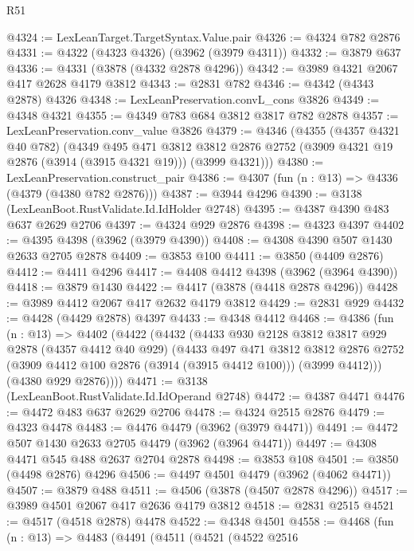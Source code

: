 \begin{lexlean}{R51}
\begin{coremodule}
@4324 := LexLeanTarget.TargetSyntax.Value.pair
@4326 := @4324 @782 @2876
@4331 := @4322 (@4323 @4326) (@3962 (@3979 @4311))
@4332 := @3879 @637
@4336 := @4331 (@3878 (@4332 @2878 @4296))
@4342 := @3989 @4321 @2067 @417 @2628 @4179 @3812
@4343 := @2831 @782
@4346 := @4342 (@4343 @2878) @4326
@4348 := LexLeanPreservation.convL_cons @3826
@4349 := @4348 @4321
@4355 := @4349 @783 @684 @3812 @3817 @782 @2878
@4357 := LexLeanPreservation.conv_value @3826
@4379 := @4346
    (@4355
      (@4357 @4321 @40 @782)
      (@4349
        @495
        @471
        @3812
        @3812
        @2876
        @2752
        (@3909 @4321 @19 @2876 (@3914 (@3915 @4321 @19)))
        (@3999 @4321)))
@4380 := LexLeanPreservation.construct_pair
@4386 := @4307 (fun (n : @13) => @4336 (@4379 (@4380 @782 @2876)))
@4387 := @3944 @4296
@4390 := @3138 (LexLeanBoot.RustValidate.Id.IdHolder @2748)
@4395 := @4387 @4390 @483 @637 @2629 @2706
@4397 := @4324 @929 @2876
@4398 := @4323 @4397
@4402 := @4395 @4398 (@3962 (@3979 @4390))
@4408 := @4308 @4390 @507 @1430 @2633 @2705 @2878
@4409 := @3853 @100
@4411 := @3850 (@4409 @2876)
@4412 := @4411 @4296
@4417 := @4408 @4412 @4398 (@3962 (@3964 @4390))
@4418 := @3879 @1430
@4422 := @4417 (@3878 (@4418 @2878 @4296))
@4428 := @3989 @4412 @2067 @417 @2632 @4179 @3812
@4429 := @2831 @929
@4432 := @4428 (@4429 @2878) @4397
@4433 := @4348 @4412
@4468 := @4386
    (fun (n : @13) =>
    @4402
      (@4422
        (@4432
          (@4433
            @930
            @2128
            @3812
            @3817
            @929
            @2878
            (@4357 @4412 @40 @929)
            (@4433
              @497
              @471
              @3812
              @3812
              @2876
              @2752
              (@3909 @4412 @100 @2876 (@3914 (@3915 @4412 @100)))
              (@3999 @4412)))
          (@4380 @929 @2876))))
@4471 := @3138 (LexLeanBoot.RustValidate.Id.IdOperand @2748)
@4472 := @4387 @4471
@4476 := @4472 @483 @637 @2629 @2706
@4478 := @4324 @2515 @2876
@4479 := @4323 @4478
@4483 := @4476 @4479 (@3962 (@3979 @4471))
@4491 := @4472 @507 @1430 @2633 @2705 @4479 (@3962 (@3964 @4471))
@4497 := @4308 @4471 @545 @488 @2637 @2704 @2878
@4498 := @3853 @108
@4501 := @3850 (@4498 @2876) @4296
@4506 := @4497 @4501 @4479 (@3962 (@4062 @4471))
@4507 := @3879 @488
@4511 := @4506 (@3878 (@4507 @2878 @4296))
@4517 := @3989 @4501 @2067 @417 @2636 @4179 @3812
@4518 := @2831 @2515
@4521 := @4517 (@4518 @2878) @4478
@4522 := @4348 @4501
@4558 := @4468
    (fun (n : @13) =>
    @4483
      (@4491
        (@4511
          (@4521
            (@4522
              @2516

\end{coremodule}
\end{lexlean}
